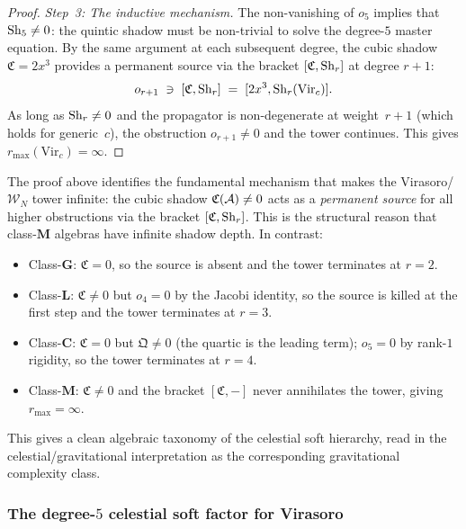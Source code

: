 \begin{proof}
\medskip\noindent
\emph{Step~3: The inductive mechanism.}\;
The non-vanishing of $o_5$ implies that $\operatorname{Sh}_5 \neq 0$: the
quintic shadow must be non-trivial to solve the degree-$5$ master
equation. By the same argument at each subsequent degree, the
cubic shadow $\mathfrak{C} = 2x^3$ provides a permanent source
via the bracket $[\mathfrak{C}, \operatorname{Sh}_r]$ at degree $r+1$:
\[
o_{r+1} \;\ni\;
[\mathfrak{C}, \operatorname{Sh}_r]
\;=\;
[2x^3, \operatorname{Sh}_r(\mathrm{Vir}_c)].
\]
As long as $\operatorname{Sh}_r \neq 0$ and the propagator is non-degenerate
at weight~$r+1$ (which holds for generic~$c$), the obstruction
$o_{r+1} \neq 0$ and the tower continues. This gives
$r_{\max}(\mathrm{Vir}_c) = \infty$.
\end{proof}

\begin{remark}
\label{rem:thqg-VI-cubic-source}
The proof above identifies the fundamental mechanism that makes
the Virasoro/\hskip0pt$\mathcal{W}_N$ tower infinite: the
cubic shadow $\mathfrak{C}(\mathcal{A}) \neq 0$ acts as a
\emph{permanent source} for all higher obstructions via the
bracket $[\mathfrak{C}, \operatorname{Sh}_r]$. This is the structural
reason that class-$\mathbf{M}$ algebras have infinite shadow
depth. In contrast:
\begin{itemize}
\item Class-$\mathbf{G}$: $\mathfrak{C} = 0$, so
 the source is absent and the tower terminates at $r = 2$.
\item Class-$\mathbf{L}$: $\mathfrak{C} \neq 0$ but
 $o_4 = 0$ by the Jacobi identity, so the source is
 killed at the first step and the tower terminates at $r = 3$.
\item Class-$\mathbf{C}$: $\mathfrak{C} = 0$ but
 $\mathfrak{Q} \neq 0$ (the quartic is the leading term);
 $o_5 = 0$ by rank-$1$ rigidity, so the tower terminates at
 $r = 4$.
\item Class-$\mathbf{M}$: $\mathfrak{C} \neq 0$ and the
 bracket $[\mathfrak{C}, -]$ never annihilates the tower,
 giving $r_{\max} = \infty$.
\end{itemize}
This gives a clean algebraic taxonomy of the celestial soft
hierarchy, read in the celestial/gravitational interpretation as
the corresponding gravitational complexity class.
\end{remark}

\subsubsection{The degree-$5$ celestial soft factor for Virasoro}

